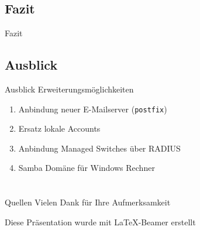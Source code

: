 \documentclass[handout,svgnames]{beamer}
\newcommand{\mcc}[2]{\multicolumn{#1}{|c|}{#2}} %
\begin{document}
\subsection{Fazit}
\begin{frame}{Fazit}

\end{frame}


\subsection{Ausblick}
\begin{frame}{Ausblick}
	Erweiterungsmöglichkeiten
	\begin{enumerate}
		\item Anbindung neuer E-Mailserver (\texttt{postfix})
		\item Ersatz lokale Accounts
		\item Anbindung Managed Switches über RADIUS
		\item Samba Domäne für Windows Rechner
	\end{enumerate}
\end{frame}

\section{}%
\begin{frame}{Quellen}
	Vielen Dank für Ihre Aufmerksamkeit
	
	\medskip Diese Präsentation wurde mit \LaTeX{}-Beamer erstellt
\end{frame}


\end{document}
